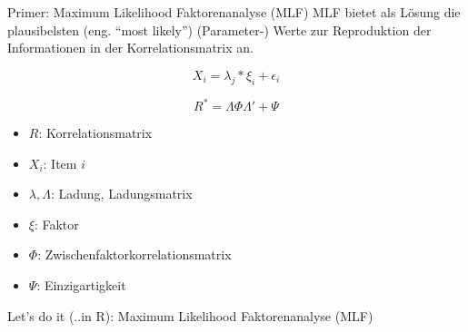 \documentclass[
  ignorenonframetext,
]{beamer}
\newenvironment{Shaded}{\begin{snugshade}}{\end{snugshade}}
\newcommand{\AttributeTok}[1]{\textcolor[rgb]{0.77,0.63,0.00}{#1}}
\newcommand{\CommentTok}[1]{\textcolor[rgb]{0.56,0.35,0.01}{\textit{#1}}}
\newcommand{\DecValTok}[1]{\textcolor[rgb]{0.00,0.00,0.81}{#1}}
\newcommand{\FunctionTok}[1]{\textcolor[rgb]{0.00,0.00,0.00}{#1}}
\newcommand{\NormalTok}[1]{#1}
\newcommand{\OtherTok}[1]{\textcolor[rgb]{0.56,0.35,0.01}{#1}}
\newcommand{\SpecialCharTok}[1]{\textcolor[rgb]{0.00,0.00,0.00}{#1}}
\newcommand{\StringTok}[1]{\textcolor[rgb]{0.31,0.60,0.02}{#1}}
\providecommand{\tightlist}{%
  \setlength{\itemsep}{0pt}\setlength{\parskip}{0pt}}
\begin{document}
\begin{frame}{Primer: Maximum Likelihood Faktorenanalyse (MLF)}
\protect\hypertarget{primer-maximum-likelihood-faktorenanalyse-mlf}{}
MLF bietet als Lösung die plausibelsten (eng. ``most likely'')
(Parameter-) Werte zur Reproduktion der Informationen in der
Korrelationsmatrix an.

\begin{equation}
  X_i = \lambda_j*\xi_i + \epsilon_i
\end{equation}

\begin{equation}
  R^* = \Lambda \Phi \Lambda' + \Psi
\end{equation}

\begin{itemize}
\tightlist
\item
  \(R\): Korrelationsmatrix
\item
  \(X_i\): Item \(i\)
\item
  \(\lambda, \Lambda\): Ladung, Ladungsmatrix
\item
  \(\xi\): Faktor
\item
  \(\Phi\): Zwischenfaktorkorrelationsmatrix
\item
  \(\Psi\): Einzigartigkeit
\end{itemize}
\end{frame}

\begin{frame}[fragile]{Let's do it (..in R): Maximum Likelihood
Faktorenanalyse (MLF)}
\protect\hypertarget{lets-do-it-..in-r-maximum-likelihood-faktorenanalyse-mlf}{}
\begin{Shaded}
\end{Shaded}
\end{frame}
\end{document}
